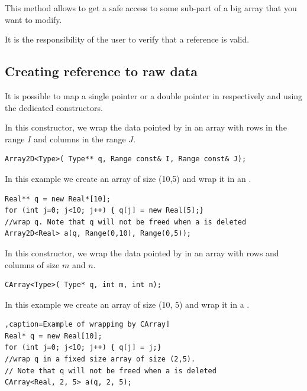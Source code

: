\documentclass[a4paper,10pt]{article}
\begin{document}
This method allows to get a safe access to some sub-part of a big array that
you want to modify.

\begin{warning}
It is the responsibility of the user to verify that a reference is valid.
\end{warning}

\subsection{Creating reference to raw data}

It is possible to map a single pointer  or a double pointer 
in respectively  and  using the dedicated constructors.


In this constructor, we wrap the data pointed by  in an array with rows in
the range $I$ and columns in the range $J$.
\begin{lstlisting}[style=customcpp,caption=Wrapping raw data in Array2D]
Array2D<Type>( Type** q, Range const& I, Range const& J);
\end{lstlisting}

In this example we create an array of size (10,5) and wrap it in an .
\begin{lstlisting}[style=customcpp,caption=Example of wrapping by Array2D]
Real** q = new Real*[10];
for (int j=0; j<10; j++) { q[j] = new Real[5];}
//wrap q. Note that q will not be freed when a is deleted
Array2D<Real> a(q, Range(0,10), Range(0,5));
\end{lstlisting}


In this constructor, we wrap the data pointed by  in an array with rows
and columns of size $m$ and $n$.
\begin{lstlisting}[style=customcpp,caption=Wrapping raw data in CArray]
CArray<Type>( Type* q, int m, int n);
\end{lstlisting}

In this example we create an array of size (10, 5) and wrap it in a .
\begin{lstlisting}[style=customcpp],caption=Example of wrapping by CArray]
Real* q = new Real[10];
for (int j=0; j<10; j++) { q[j] = j;}
//wrap q in a fixed size array of size (2,5).
// Note that q will not be freed when a is deleted
CArray<Real, 2, 5> a(q, 2, 5);
\end{lstlisting}


%
%
\end{document}
